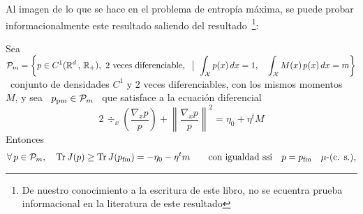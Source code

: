 Al imagen  de lo que  se hace  en el problema  de entrop\'ia m\'axima,  se puede
probar  informacionalmente este  resultado  saliendo del  resultado~\footnote{De
nuestro  conocimiento a  la  escritura  de este  libro,  no  se ecuentra  prueba
informacional en la literatura de este resultado}:
%
\begin{lema}
\label{Lem:SZ:MinFisherPruebaInfo}
%
  Sea   \    $\displaystyle   \P_m    =   \left\{    p   \in    C^1(\Rset^d   \,
  , \,  \Rset_+), \  \mbox{2 veces diferenciable,}  \ \tq \int_\X  p(x) \,  dx =
  1, \quad \int_\X M(x)  \, p(x) \, dx = m \right\}$ \  conjunto de densidades $C^1$ y 2
  veces   diferenciables,   con  los   mismos   momentos   \   $M$,  y   sea   \
  $p_{\mathrm{pm}} \in \P_m$ \ que satisface a la ecuaci\'on diferencial
  \[
  2 \, \div_x \left(  \frac{\nabla_x p}{p} \right) + \left\| \frac{\nabla_x
  p}{p}  \right\|^2 = \eta_0 + \eta^t M
  \]
  Entonces
  \[
  \forall \, p \in \P_m, \quad \Tr J(p) \ge \Tr J(p_{\mathrm{fm}}) = -\eta_0
    - \eta^t m \qquad \mbox{con igualdad ssi} \quad p =
    p_{\mathrm{fm}} \quad \mu\mbox{-(c. s.)},
  \]
\end{lema}
%
